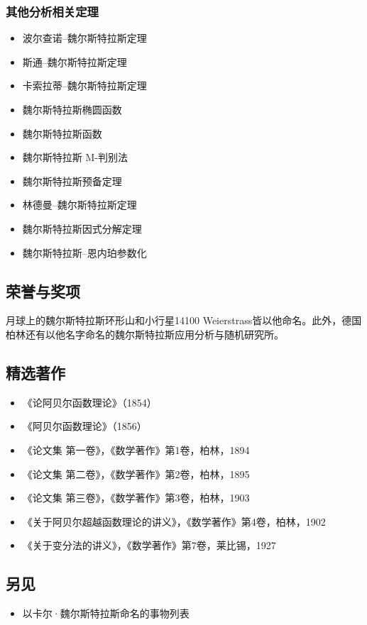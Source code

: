 \subsubsection{其他分析相关定理}
\begin{itemize}
\item 波尔查诺–魏尔斯特拉斯定理
\item 斯通–魏尔斯特拉斯定理
\item 卡索拉蒂–魏尔斯特拉斯定理
\item 魏尔斯特拉斯椭圆函数
\item 魏尔斯特拉斯函数
\item 魏尔斯特拉斯 M-判别法
\item 魏尔斯特拉斯预备定理
\item 林德曼–魏尔斯特拉斯定理
\item 魏尔斯特拉斯因式分解定理
\item 魏尔斯特拉斯–恩内珀参数化
\end{itemize}
\subsection{荣誉与奖项}
月球上的魏尔斯特拉斯环形山和小行星14100 Weierstrass皆以他命名。此外，德国柏林还有以他名字命名的魏尔斯特拉斯应用分析与随机研究所。
\subsection{精选著作}
\begin{itemize}
\item 《论阿贝尔函数理论》（1854）
\item 《阿贝尔函数理论》（1856）
\item 《论文集 第一卷》，《数学著作》第1卷，柏林，1894
\item 《论文集 第二卷》，《数学著作》第2卷，柏林，1895
\item 《论文集 第三卷》，《数学著作》第3卷，柏林，1903
\item 《关于阿贝尔超越函数理论的讲义》，《数学著作》第4卷，柏林，1902
\item 《关于变分法的讲义》，《数学著作》第7卷，莱比锡，1927
\end{itemize}
\subsection{另见}
\begin{itemize}
\item 以卡尔·魏尔斯特拉斯命名的事物列表
\end{itemize}
